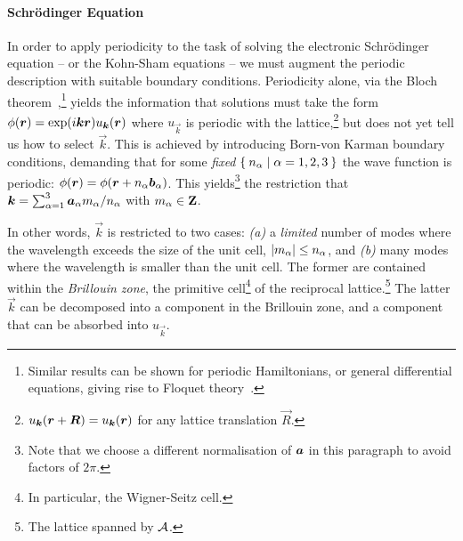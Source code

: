 \paragraph{Schrödinger Equation} In order to apply periodicity to the task of solving the electronic Schrödinger equation -- or the Kohn-Sham equations -- we must augment the periodic description with suitable boundary conditions. Periodicity alone, via the Bloch theorem~\cite{b1929p},\footnote{Similar results can be shown for periodic Hamiltonians, or general differential equations, giving rise to Floquet theory~\cite{f1883p}.} yields the information that solutions must take the form $\phi(\boldsymbol{r}) = \exp(i \boldsymbol{k} \boldsymbol{r}) u_{\boldsymbol{k}}(\boldsymbol{r})$ where $u_{\vec{k}}$ is periodic with the lattice,\footnote{$u_{\boldsymbol{k}}(\boldsymbol{r} + \boldsymbol{R}) = u_{\boldsymbol{k}}(\boldsymbol{r})$ for any lattice translation $\vec{R}$.} but does not yet tell us how to select $\vec{k}$. This is achieved by introducing Born-von Karman boundary conditions, demanding that for some \emph{fixed} $\Set{n_\alpha | \alpha=1,2,3}$ the wave function is periodic: $\phi(\boldsymbol{r}) = \phi(\boldsymbol{r} + n_\alpha \boldsymbol{b}_\alpha)$. This yields\footnote{Note that we choose a different normalisation of $\boldsymbol{a}$ in this paragraph to avoid factors of $2 \pi$.} the restriction that $\boldsymbol{k} = \sum_{\alpha=1}^3\nolimits \boldsymbol{a}_\alpha m_\alpha / n_\alpha$ with $m_\alpha \in {\bf Z}$. 

In other words, $\vec{k}$ is restricted to two cases: \emph{(a)} a \emph{limited} number of modes where the wavelength exceeds the size of the unit cell, $|m_\alpha| \leq n_\alpha$, and \emph{(b)} many modes where the wavelength is smaller than the unit cell. The former are contained within the \emph{Brillouin zone}, the primitive cell\footnote{In particular, the Wigner-Seitz cell.} of the reciprocal lattice.\footnote{The lattice spanned by $\mathcal{A}$.} The latter $\vec{k}$ can be decomposed into a component in the Brillouin zone, and a component that can be absorbed into $u_{\vec{k}}$.

